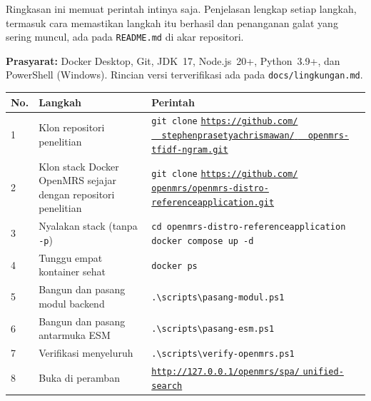 \newpage
{}

\noindent
Ringkasan ini memuat perintah intinya saja. Penjelasan lengkap setiap langkah,
termasuk cara memastikan langkah itu berhasil dan penanganan galat yang sering
muncul, ada pada \texttt{README.md} di akar repositori.

\vspace{1ex}
\noindent\textbf{Prasyarat:} Docker Desktop, Git, JDK~17, Node.js~20+,
Python~3.9+, dan PowerShell (Windows). Rincian versi terverifikasi ada pada
\texttt{docs/lingkungan.md}.

\vspace{1.5ex}
\renewcommand{\arraystretch}{1.2}
\begin{tabular}{@{}p{}p{}p{}@{}}
\toprule
\textbf{No.} & \textbf{Langkah} & \textbf{Perintah} \\
\midrule
1 & Klon repositori penelitian &
\texttt{git clone}
\href{\tautanRepo}{\texttt{https://github.com/} \newline
\texttt{~~stephenprasetyachrismawan/} \newline
\texttt{~~openmrs-tfidf-ngram.git}} \\
2 & Klon stack Docker OpenMRS sejajar dengan repositori penelitian &
\texttt{git clone}
\href{\tautanDistro}{\texttt{https://github.com/} \newline
\texttt{openmrs/openmrs-distro-} \newline
\texttt{referenceapplication.git}} \\
3 & Nyalakan stack (tanpa \texttt{-p}) &
\texttt{cd openmrs-distro-referenceapplication} \newline
\texttt{docker compose up -d} \\
4 & Tunggu empat kontainer sehat &
\texttt{docker ps} \\
5 & Bangun dan pasang modul backend &
\texttt{.\textbackslash scripts\textbackslash pasang-modul.ps1} \\
6 & Bangun dan pasang antarmuka ESM &
\texttt{.\textbackslash scripts\textbackslash pasang-esm.ps1} \\
7 & Verifikasi menyeluruh &
\texttt{.\textbackslash scripts\textbackslash verify-openmrs.ps1} \\
8 & Buka di peramban &
\href{\tautanHalaman}{\texttt{http://127.0.0.1/openmrs/spa/} \newline
\texttt{unified-search}} \\
\bottomrule
\end{tabular}

